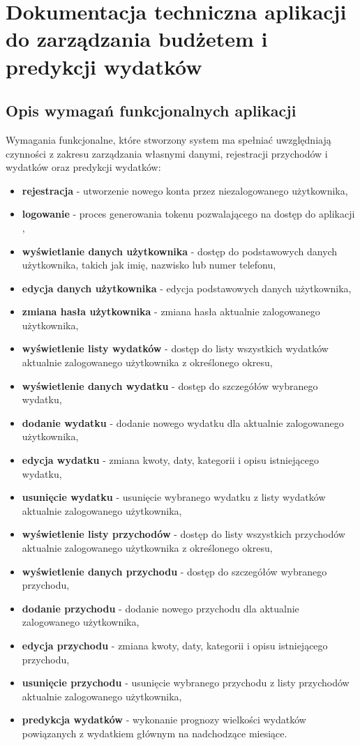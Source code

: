 \chapter{Dokumentacja techniczna aplikacji do zarządzania budżetem i predykcji wydatków}
\section{Opis wymagań funkcjonalnych aplikacji}
Wymagania funkcjonalne, które stworzony system ma spełniać uwzględniają czynności z zakresu zarządzania własnymi danymi, rejestracji przychodów i wydatków oraz predykcji wydatków:
\begin{itemize}
	\item\textbf{rejestracja} - utworzenie nowego konta przez niezalogowanego użytkownika, 
	\item\textbf{logowanie} - proces generowania tokenu pozwalającego na dostęp do aplikacji ,
	\item\textbf{wyświetlanie danych użytkownika} - dostęp do podstawowych danych użytkownika, takich jak imię, nazwisko lub numer telefonu,
	\item\textbf{edycja danych użytkownika} - edycja podstawowych danych użytkownika,
	\item\textbf{zmiana hasła użytkownika} - zmiana hasła aktualnie zalogowanego użytkownika,
	\item\textbf{wyświetlenie listy wydatków} - dostęp do listy wszystkich wydatków aktualnie zalogowanego użytkownika z określonego okresu,
	\item\textbf{wyświetlenie danych wydatku} - dostęp do szczegółów wybranego wydatku,
	\item\textbf{dodanie wydatku} - dodanie nowego wydatku dla aktualnie zalogowanego użytkownika,
	\item\textbf{edycja wydatku} - zmiana kwoty, daty, kategorii i opisu istniejącego wydatku,
	\item\textbf{usunięcie wydatku} - usunięcie wybranego wydatku z listy wydatków aktualnie zalogowanego użytkownika,
	\item\textbf{wyświetlenie listy przychodów} - dostęp do listy wszystkich przychodów aktualnie zalogowanego użytkownika z określonego okresu,
	\item\textbf{wyświetlenie danych przychodu} - dostęp do szczegółów wybranego przychodu,
	\item\textbf{dodanie przychodu} - dodanie nowego przychodu dla aktualnie zalogowanego użytkownika,
	\item\textbf{edycja przychodu} - zmiana kwoty, daty, kategorii i opisu istniejącego przychodu,
	\item\textbf{usunięcie przychodu} - usunięcie wybranego przychodu z listy przychodów aktualnie zalogowanego użytkownika,
	\item\textbf{predykcja wydatków} - wykonanie prognozy wielkości wydatków powiązanych z wydatkiem głównym na nadchodzące miesiące.
\end{itemize}
